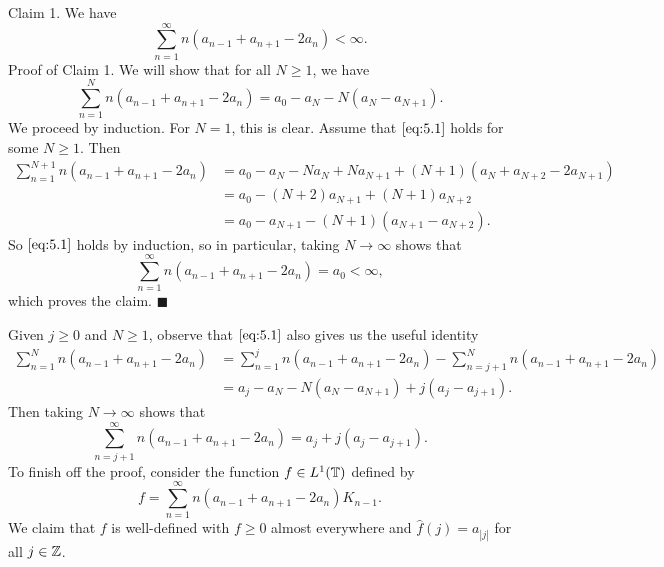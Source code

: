 {\sc Claim 1.} We have 
\[ \sum_{n=1}^\infty n(a_{n-1} + a_{n+1} - 2a_n) < \infty. \] 
{\sc Proof of Claim 1.} We will show that for all $N \geq 1$, we have 
\begin{equation}\label{eq:5.1} 
    \sum_{n=1}^N n(a_{n-1} + a_{n+1} - 2a_n) = a_0 - a_N - N(a_N - a_{N+1}). \tag{$\star$} 
\end{equation}  
We proceed by induction. For $N = 1$, this is clear. Assume that $\eqref{eq:5.1}$
holds for some $N \geq 1$. Then 
\begin{align*}
    \sum_{n=1}^{N+1} n(a_{n-1} + a_{n+1} - 2a_n) 
    &= a_0 - a_N - Na_N + Na_{N+1} + (N+1)(a_N + a_{N+2} - 2a_{N+1}) \\ 
    &= a_0 - (N+2)a_{N+1} + (N+1)a_{N+2} \\ 
    &= a_0 - a_{N+1} - (N+1)(a_{N+1} - a_{N+2}). 
\end{align*} 
So $\eqref{eq:5.1}$ holds by induction, so in particular, taking $N \to \infty$ 
shows that 
\[ \sum_{n=1}^\infty n(a_{n-1} + a_{n+1} - 2a_n) = a_0 < \infty, \] 
which proves the claim. \hfill$\blacksquare$

Given $j \geq 0$ and $N \geq 1$, observe that $\eqref{eq:5.1}$ also gives us 
the useful identity 
\begin{align*}
    \sum_{n=1}^N n(a_{n-1} + a_{n+1} - 2a_n) 
    &= \sum_{n=1}^j n(a_{n-1} + a_{n+1} - 2a_n) - 
    \sum_{n=j+1}^N n(a_{n-1} + a_{n+1} - 2a_n) \\ 
    &= a_j - a_N - N(a_N - a_{N+1}) + j(a_j - a_{j+1}). 
\end{align*}
Then taking $N \to \infty$ shows that 
\begin{equation}\label{eq:5.2}
    \sum_{n=j+1}^\infty n(a_{n-1} + a_{n+1} - 2a_n) 
    = a_j + j(a_j - a_{j+1}). \tag{$\star\star$}
\end{equation}
To finish off the proof, consider the function $f \in L^1(\mathbb{T})$ defined by 
\[ f = \sum_{n=1}^\infty n(a_{n-1} + a_{n+1} - 2a_n)K_{n-1}. \] 
We claim that $f$ is well-defined with $f \geq 0$ almost everywhere 
and $\hat f(j) = a_{|j|}$ for all $j \in \mathbb{Z}$. 

